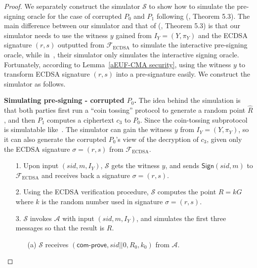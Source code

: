 \documentclass{llncs}
\begin{document}
\begin{proof}

We separately construct the simulator $\mathcal{S}$ to show how to simulate the pre-signing oracle for the case of corrupted $P_0$ and $P_1$ following (\cite{Lin17}, Theorem 5.3). The main difference between our simulator and that of (\cite{Lin17}, Theorem 5.3) is that our simulator needs to use the witness $y$ gained from $I_Y=(Y,\pi_Y)$ and the ECDSA signature $(r,s)$ outputted from $\mathcal{F}_{\text{ECDSA}}$ to simulate the interactive pre-signing oracle, while in~\cite{Lin17}, their simulator only simulates the interactive signing oracle. Fortunately, according to Lemma~\ref{aEUF-CMA security}, using the witness $y$ to transform ECDSA signature $(r,s)$ into a pre-signature easily. We construct the simulator as follows.


\begin{trivlist}
\item \textbf{Simulating pre-signing - corrupted $P_0$.} The idea behind the simulation is that both parties first run a ``coin tossing'' protocol to generate a random point $\hat{R}$, and then $P_1$ computes a ciphertext $c_3$ to $P_0$. Since the coin-tossing subprotocol is simulatable like~\cite{Lin17}. The simulator can gain the witness $y$ from $I_Y=(Y,\pi_Y)$, so it can also generate the corrupted $P_0$’s view of the decryption of $c_3$, given only the ECDSA signature $\sigma=(r,s)$ from $\mathcal{F}_{\text{ECDSA}}$.

\begin{itemize}
\item[1.] Upon input $(sid,m,I_Y)$, $\mathcal{S}$ gets the witness $y$, and sends $\mathsf{Sign}(sid,m)$ to $\mathcal{F}_{\text{ECDSA}}$ and receives back a signature $\sigma=(r, s)$. 

\item[2.] Using the ECDSA verification procedure, $\mathcal{S}$ computes the point $R=kG$ where $k$ is the random number used in signature $\sigma=(r, s)$.

\item[3.] $\mathcal{S}$ invokes $\mathcal{A}$ with input $(sid,m,I_Y)$, and simulates the first three messages so that the result is $R$.

\begin{itemize}
\item[(a)] $\mathcal{S}$ receives $(\mathsf{com\text{-}prove}, sid||0, R_0, k_0)$ from $\mathcal{A}$.


\end{itemize}
\end{itemize}
\end{trivlist}
\end{proof}
\end{document}
